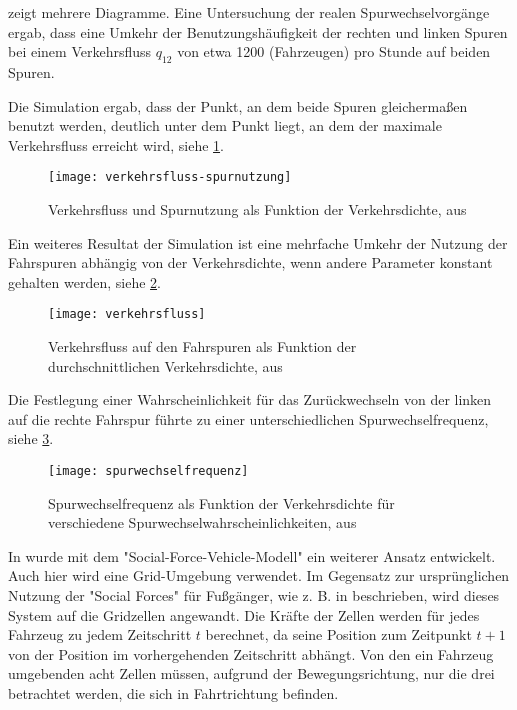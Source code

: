 \cite{multi-lane} zeigt mehrere Diagramme. Eine Untersuchung der realen Spurwechselvorgänge ergab, dass eine Umkehr der Benutzungshäufigkeit der rechten und linken Spuren bei einem Verkehrsfluss $q_{12}$ von etwa 1200 (Fahrzeugen) pro Stunde auf beiden Spuren.

Die Simulation ergab, dass der Punkt, an dem beide Spuren gleichermaßen benutzt werden, deutlich unter dem Punkt liegt, an dem der maximale Verkehrsfluss erreicht wird, siehe \cref{figure:verkehrsfluss-spurnutzung}.

\begin{figure}[hptb]
 \centering
 \texttt{[image: verkehrsfluss-spurnutzung]}
 \caption[Verkehrsfluss und Spurnutzung als Funktion der Verkehrsdichte]{Verkehrsfluss und Spurnutzung als Funktion der Verkehrsdichte, aus \cite{multi-lane}}
 \label{figure:verkehrsfluss-spurnutzung}
\end{figure}

Ein weiteres Resultat der Simulation ist eine mehrfache Umkehr der Nutzung der Fahrspuren abhängig von der Verkehrsdichte, wenn andere Parameter konstant gehalten werden, siehe \cref{figure:verkehrsfluss}.

\begin{figure}[hptb]
 \centering
 \texttt{[image: verkehrsfluss]}
 \caption[Verkehrsfluss als Funktion der durchschnittlichen Verkehrsdichte]{Verkehrsfluss auf den Fahrspuren als Funktion der durchschnittlichen Verkehrsdichte, aus \cite{multi-lane}}
 \label{figure:verkehrsfluss}
\end{figure}

Die Festlegung einer Wahrscheinlichkeit für das Zurückwechseln von der linken auf die rechte Fahrspur führte zu einer unterschiedlichen Spurwechselfrequenz, siehe \cref{figure:spurwechselfrequenz}.

\begin{figure}[hptb]
 \centering
 \texttt{[image: spurwechselfrequenz]}
 \caption[Spurwechselfrequenz als Funktion der Verkehrsdichte]{Spurwechselfrequenz als Funktion der Verkehrsdichte für verschiedene Spurwechselwahrscheinlichkeiten, aus \cite{multi-lane}}
 \label{figure:spurwechselfrequenz}
\end{figure}

In \cite{dat-ba} wurde mit dem "Social-Force-Vehicle-Modell" ein weiterer Ansatz entwickelt.
Auch hier wird eine Grid-Umgebung verwendet.
Im Gegensatz zur ursprünglichen Nutzung der "Social Forces" für Fußgänger, wie z. B. in \cite{soc-for} beschrieben, wird dieses System auf die Gridzellen angewandt. Die Kräfte der Zellen werden für jedes Fahrzeug zu jedem Zeitschritt $t$ berechnet, da seine Position zum Zeitpunkt $t + 1$ von der Position im vorhergehenden Zeitschritt abhängt.
Von den ein Fahrzeug umgebenden acht Zellen müssen, aufgrund der Bewegungsrichtung, nur die drei betrachtet werden, die sich in Fahrtrichtung befinden.

